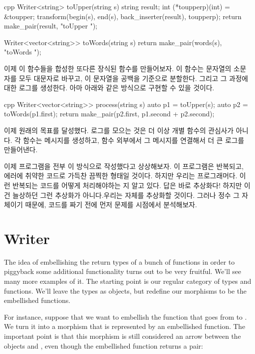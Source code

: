 \begin{snip}{cpp}
Writer<string> toUpper(string s) {
    string result;
    int (*toupperp)(int) = &toupper;
    transform(begin(s), end(s), back_inserter(result), toupperp);
    return make_pair(result, "toUpper "); 
}

Writer<vector<string>> toWords(string s) { 
    return make_pair(words(s), "toWords ");
}
\end{snip}
이제 이 함수들을 합성한 또다른 장식된 함수를 만들어보자. 이 함수는 문자열의 소문자를 모두 대문자로 바꾸고, 이 문자열을 공백을 기준으로 분할한다. 그리고 그 과정에 대한 로그를 생성한다.
아마 아래와 같은 방식으로 구현할 수 있을 것이다.

\begin{snip}{cpp}
Writer<vector<string>> process(string s) {
    auto p1 = toUpper(s);
    auto p2 = toWords(p1.first);
    return make_pair(p2.first, p1.second + p2.second);
}
\end{snip}
이제 원래의 목표를 달성했다. 로그를 모으는 것은 더 이상 개별 함수의 관심사가 아니다. 각 함수는 메시지를 생성하고, 함수 외부에서 그 메시지를 연결해서 더 큰 로그를 만들어낸다.

이제 프로그램을 전부 이 방식으로 작성했다고 상상해보자. 이 프로그램은 반복되고, 에러에 취약한 코드로 가득찬 끔찍한 형태일 것이다. 하지만 우리는 프로그래머다.
이런 반복되는 코드를 어떻게 처리해야하는 지 알고 있다. 답은 바로 추상화다!
하지만 이건 늘상하던 그런 추상화가 아니다.우리는  자체를 추상화할 것이다.
그러나   정수 그 자체이기 때문에, 코드를 짜기 전에 먼저 문제를  시점에서 분석해보자.

\section{Writer \trCategory}

The idea of embellishing the return types of a bunch of functions in
order to piggyback some additional functionality turns out to be very
fruitful. We'll see many more examples of it. The starting point is our
regular category of types and functions. We'll leave the types as
objects, but redefine our morphisms to be the embellished functions.

For instance, suppose that we want to embellish the function
 that goes from  to . We turn it
into a morphism that is represented by an embellished function. The
important point is that this morphism is still considered an arrow
between the objects  and , even though the
embellished function returns a pair:


